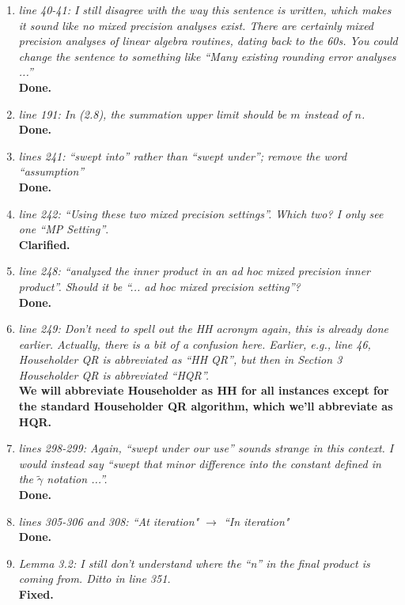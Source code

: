 \documentclass[final,onefignum,onetabnum]{siamart190516}
\begin{document}
\begin{enumerate}
	\item {\it line 40-41: I still disagree with the way this sentence is written, which makes it sound like no mixed precision analyses exist. There are certainly mixed precision analyses of linear algebra routines, dating back to the 60s. You could change the sentence to something like ``Many existing rounding error analyses ...''}\\
	{\bf Done.}
	
	\item {\it line 191: In (2.8), the summation upper limit should be $m$ instead of $n$.}\\
	{\bf Done.}
	
	\item {\it lines 241: ``swept into'' rather than ``swept under''; remove the word ``assumption''}\\
	{\bf Done.}
	
	\item {\it line 242: ``Using these two mixed precision settings''. Which two? I only see one ``MP Setting''}.\\
	{\bf Clarified.}
	
	\item {\it line 248: ``analyzed the inner product in an ad hoc mixed precision inner product''. Should it be ``... ad hoc mixed precision setting''?}\\
	{\bf Done.}
	
	\item {\it line 249: Don't need to spell out the HH acronym again, this is already done earlier. Actually, there is a bit of a confusion here. Earlier, e.g., line 46, Householder QR is abbreviated as ``HH QR'', but then in Section 3 Householder QR is abbreviated ``HQR''. }\\
	{\bf We will abbreviate Householder as HH for all instances except for the standard Householder QR algorithm, which we'll abbreviate as HQR.}
	
	\item {\it lines 298-299: Again, ``swept under our use'' sounds strange in this context. I would instead say ``swept that minor difference into the constant defined in the $\tilde{\gamma}$ notation ...''.}\\
	{\bf Done.}
	
	\item {\it lines 305-306 and 308: ``At iteration" $\rightarrow$ ``In iteration" }\\
	{\bf Done.}
	
	\item {\it Lemma 3.2: I still don't understand where the ``n'' in the final product is coming from. Ditto in line 351.} \\
	{\bf Fixed.}
	

\end{enumerate}
\end{document}

